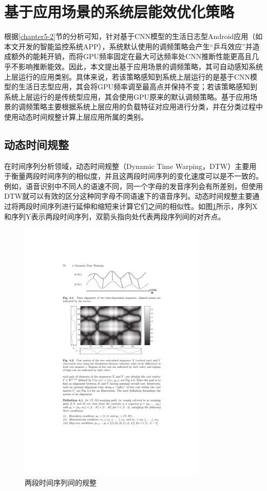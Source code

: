 \section{基于应用场景的系统层能效优化策略}
\label{chapter5-3}

根据\ref{chapter5-2}节的分析可知，针对基于CNN模型的生活日志型Android应用（如本文开发的智能监控系统APP），系统默认使用的调频策略会产生“乒乓效应”并造成额外的能耗开销，而将GPU频率固定在最大可达频率处CNN推断性能更高且几乎不影响推断能效。因此，本文提出基于应用场景的调频策略，其可自动感知系统上层运行的应用类别。具体来说，若该策略感知到系统上层运行的是基于CNN模型的生活日志型应用，其会将GPU频率调至最高点并保持不变；若该策略感知到系统上层运行的是传统型应用，其会使用GPU原来的默认调频策略。基于应用场景的调频策略主要根据系统上层应用的负载特征对应用进行分类，并在分类过程中使用动态时间规整计算上层应用所属的类别。

\subsection{动态时间规整}
\label{chapter5-3-1}
在时间序列分析领域，动态时间规整（Dynamic Time Warping，DTW\cite{muller2007dynamic}）主要用于衡量两段时间序列的相似度，并且这两段时间序列的变化速度可以是不一致的。例如，语音识别中不同人的语速不同，同一个字母的发音序列会有所差别，但使用DTW就可以有效的区分这种同字母不同语速下的语音序列。动态时间规整主要通过将两段时间序列进行延伸和缩短来计算它们之间的相似性。如图\ref{figure:figure39}所示，序列X和序列Y表示两段时间序列，双箭头指向处代表两段序列间的对齐点。

\begin{figure}[htbp]
    \centering
    \includegraphics[width=0.8\textwidth]{figures/dtw.pdf}
    \caption{两段时间序列间的规整}\label{figure:figure39}
\end{figure}

